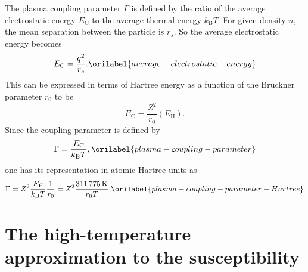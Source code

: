 \documentclass[aps,showkeys,noshowpacs,superscriptaddress,pre,preprint]{revtex4-2}
\let\label\orilabel
\begin{document}
The plasma coupling parameter $\Gamma$ is defined 
by the ratio of the average electrostatic energy $E_\mathrm{C}$ to
the average thermal energy $k_\mathrm{B} T$.
For given density $n$, the mean separation between the particle is $r_s$.
So the average electrostatic energy becomes
\begin{equation}
E_\mathrm{C} = \frac{q^2}{r_s} .
\label{average-electrostatic-energy}
\end{equation}
This can be expressed in terms of Hartree energy as a function of 
the Bruckner parameter $r_0$ to be
\begin{equation*}
E_\mathrm{C} = \frac{Z^2}{r_0} \left( E_\mathrm{H} \right) .
\end{equation*}
Since the coupling parameter is defined by
\begin{equation}
\Gamma = \frac{E_\mathrm{C}}{k_\mathrm{B} T} ,
\label{plasma-coupling-parameter}
\end{equation}
one has its representation in atomic Hartree units as
\begin{equation}
\Gamma = Z^2 \frac{E_\mathrm{H}}{k_\mathrm{B} T} \frac{1}{r_0}
= Z^2 \frac{311\,775\,\mathrm{K}}{r_0 T} .
\label{plasma-coupling-parameter-Hartree}
\end{equation}

\section{The high-temperature approximation to the susceptibility}
\label{sec:Fried-Conte}
\end{document}
